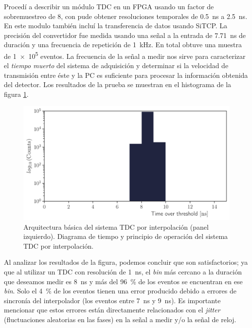 Procedí a describir un módulo TDC en un FPGA usando un factor de sobremuestreo de \num{8}, con  pude obtener resoluciones temporales de \SI{0.5}{\nano\second} a \SI{2.5}{\nano\second}. En este modulo también incluí la transferencia de datos usando SiTCP. La precisión del convertidor fue medida usando una señal a la entrada de \SI{7.71}{\nano\second} de duración y una frecuencia de repetición de \SI{1}{\kilo\hertz}. En total obtuve una muestra de \num{1e5} eventos. La frecuencia de la señal a medir nos sirve para caracterizar el \emph{tiempo muerto} del sistema de adquisición y determinar si la velocidad de transmisión entre éste y la PC es suficiente para procesar la información obtenida del detector. Los resultados de la prueba se muestran en el histograma de la figura \ref{fig:tdc-lvds}.

\begin{figure}
        \centering
        \includegraphics[width=\textwidth]{tot-lvds.pdf}
        \caption{Arquitectura básica del sistema TDC por interpolación (panel izquierdo). Diagrama de tiempo y principio de operación del sistema TDC por interpolación.}
        \label{fig:tdc-lvds}
\end{figure}

Al analizar los resultados de la figura, podemos concluir que son satisfactorios; ya que al utilizar un TDC con resolución de \SI{1}{\nano\second}, el \emph{bin} más cercano a la duración que deseamos medir es \SI{8}{\nano\second} y más del \SI{96}{\percent} de los eventos se encuentran en ese \emph{bin}. Solo el \SI{4}{\percent} de los eventos tienen una error producido debido a errores de sincronía del interpolador (los eventos entre \SI{7}{\nano\second} y \SI{9}{\nano\second}). Es importante mencionar que estos errores están directamente relacionados con el \emph{jitter} (fluctuaciones aleatorias en las fases) en la señal a medir y/o la señal de reloj.


